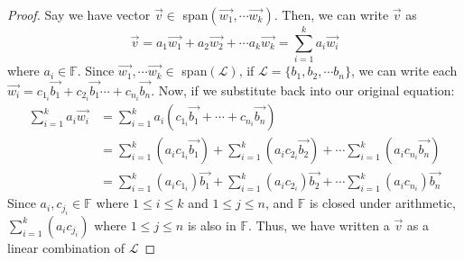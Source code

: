 \documentclass[11pt]{article}
\newcommand{\F}{\mathbb{F}}
\newcommand{\Lagr}{\mathcal{L}}
\begin{document}
\begin{proof}
    Say we have vector $\vec{v} \in$ span$(\vec{w_1}, \cdots \vec{w_k})$. Then, we can write $\vec{v}$ as 
    $$\vec{v} = a_1\vec{w_1} + a_2\vec{w_2} + \cdots a_k\vec{w_k} = \sum^k_{i=1}a_i\vec{w_i}$$
    where $a_i \in \F$. Since $\vec{w_1}, \cdots \vec{w_k} \in $ span$(\Lagr)$, if $\Lagr = \{b_1, b_2, \cdots b_n\}$, we can write each $\vec{w_i} = c_{1_i}\vec{b_1} + c_{2_i}\vec{b_1}\cdots + c_{n_i}\vec{b_n}$. Now, if we substitute back into our original equation:
    \begin{align*}
    \sum^k_{i=1}a_i\vec{w_i} &= \sum^k_{i=1}a_i(c_{1_i}\vec{b_1} + \cdots + c_{n_i}\vec{b_n}) \\
    &= \sum^k_{i=1}(a_ic_{1_i}\vec{b_1}) + \sum^k_{i=1}(a_ic_{2_i}\vec{b_2}) + \cdots \sum^k_{i=1}(a_ic_{n_i}\vec{b_n}) \\
    &= \sum^k_{i=1}(a_ic_{1_i})\vec{b_1} + \sum^k_{i=1}(a_ic_{2_i})\vec{b_2}+\cdots \sum^k_{i=1}(a_ic_{n_i})\vec{b_n}
    \end{align*}
    Since $a_i, c_{j_i}\in \F$ where $1 \leq i \leq k$ and $1\leq j \leq n$, and $\F$ is closed under arithmetic, $\sum^k_{i=1}(a_ic_{j_i})$ where $1\leq j \leq n$ is also in $\F$.
    Thus, we have written a $\vec{v}$ as a linear combination of $\Lagr$
\end{proof}
\end{document}
